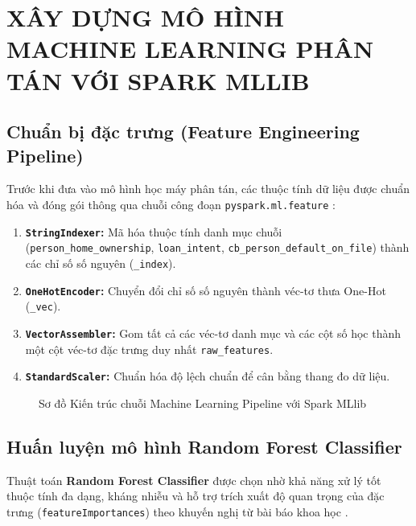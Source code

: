 \chapter{XÂY DỰNG MÔ HÌNH MACHINE LEARNING PHÂN TÁN VỚI SPARK MLLIB}

\section{Chuẩn bị đặc trưng (Feature Engineering Pipeline)}
Trước khi đưa vào mô hình học máy phân tán, các thuộc tính dữ liệu được chuẩn hóa và đóng gói thông qua chuỗi công đoạn \texttt{pyspark.ml.feature} \cite{meng2016}:
\begin{enumerate}
    \item \textbf{\texttt{StringIndexer}:} Mã hóa thuộc tính danh mục chuỗi (\texttt{person\_home\_ownership}, \texttt{loan\_intent}, \texttt{cb\_person\_default\_on\_file}) thành các chỉ số số nguyên (\texttt{\_index}).
    \item \textbf{\texttt{OneHotEncoder}:} Chuyển đổi chỉ số số nguyên thành véc-tơ thưa One-Hot (\texttt{\_vec}).
    \item \textbf{\texttt{VectorAssembler}:} Gom tất cả các véc-tơ danh mục và các cột số học thành một cột véc-tơ đặc trưng duy nhất \texttt{raw\_features}.
    \item \textbf{\texttt{StandardScaler}:} Chuẩn hóa độ lệch chuẩn để cân bằng thang đo dữ liệu.
\end{enumerate}

\begin{figure}[h!]
\centering
\caption{Sơ đồ Kiến trúc chuỗi Machine Learning Pipeline với Spark MLlib}
\label{fig:sodo_mllib_pipeline}
\end{figure}

\section{Huấn luyện mô hình Random Forest Classifier}
Thuật toán \textbf{Random Forest Classifier} được chọn nhờ khả năng xử lý tốt thuộc tính đa dạng, kháng nhiễu và hỗ trợ trích xuất độ quan trọng của đặc trưng (\texttt{featureImportances}) theo khuyến nghị từ bài báo khoa học \cite{uwais2021}.

